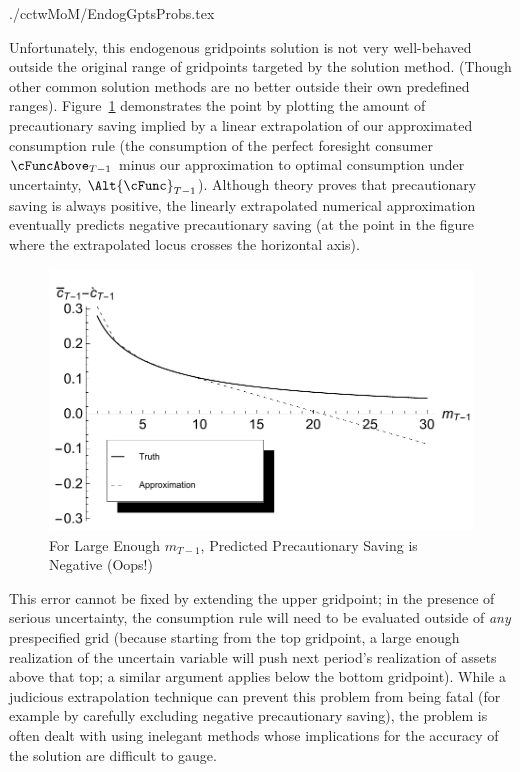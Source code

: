\documentclass[titlepage]{\econtex}
\begin{document}
\begin{verbatimwrite}{./cctwMoM/EndogGptsProbs.tex}

  Unfortunately, this endogenous gridpoints solution is not very
  well-behaved outside the original range of gridpoints targeted by
  the solution method.  (Though other common solution methods are no
  better outside their own predefined ranges).
  Figure~\ref{fig:ExtrapProblem} demonstrates the point by plotting
  the amount of precautionary saving implied by a linear extrapolation
  of our approximated consumption rule (the consumption of the perfect
  foresight consumer $\cFuncAbove_{T-1}$ minus our approximation to
  optimal consumption under uncertainty, $\Alt{\cFunc}_{T-1}$).
  Although theory proves that precautionary saving is always positive,
  the linearly extrapolated numerical approximation eventually
  predicts negative precautionary saving (at the point in the figure
  where the extrapolated locus crosses the horizontal axis).

  \hypertarget{ExtrapProblemPlot}{}
  \begin{figure}
    \includegraphics{./Figures/ExtrapProblemPlot}
    \caption{For Large Enough ${m}_{T-1}$, Predicted Precautionary Saving is Negative (Oops!)}
    \label{fig:ExtrapProblem}
  \end{figure}

  This error cannot be fixed by extending the upper gridpoint; in the
  presence of serious uncertainty, the consumption rule will need to be
  evaluated outside of \textit{any} prespecified grid (because starting
  from the top gridpoint, a large enough realization of the uncertain
  variable will push next period's realization of assets above that
  top; a similar argument applies below the bottom gridpoint).  While a judicious extrapolation technique can prevent this
  problem from being fatal (for example by carefully excluding negative
  precautionary saving), the problem is often dealt with using inelegant
  methods whose implications for the accuracy of the solution are
  difficult to gauge.
\end{verbatimwrite}

\end{document}
